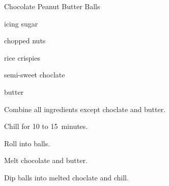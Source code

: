 \begin{recipe}{Chocolate Peanut Butter Balls}{}{}

\begin{ingredients}
\item {} 
\item {} icing sugar
\item \C{\half} chopped nuts
\item \C{\half} rice crispies
\item {} semi-sweet choclate
\item {} butter
\end{ingredients}

\begin{directions}
\item Combine all ingredients except choclate and butter.
\item Chill for 10 to 15~minutes.
\item Roll into balls.
\item Melt chocolate and butter.
\item Dip balls into melted choclate and chill.
\end{directions}
\end{recipe}
